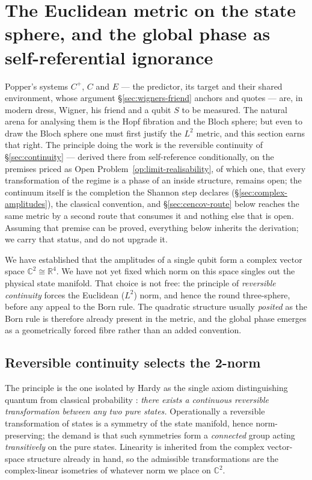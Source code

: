 \section{The Euclidean metric on the state sphere, and the global phase as self-referential ignorance}
\label{sec:l2-metric-fibre}
Popper's systems $C^{+}$, $C$ and $E$ --- the predictor, its target and their shared
environment, whose argument \S\ref{sec:wigners-friend} anchors and quotes --- are, in modern
dress, Wigner, his friend and a qubit $S$ to be measured. The natural arena for analysing them
is the Hopf fibration and the Bloch sphere; but even to draw the Bloch sphere one must first
justify the $L^{2}$ metric, and this section earns that right. The principle doing the work is
the reversible continuity of \S\ref{sec:continuity} --- derived there from self-reference
conditionally, on the premises priced as Open Problem~\ref{op:limit-realisability}, of which one, that every
transformation of the regime is a phase of an inside structure, remains open; the continuum
itself is the completion the Shannon step declares (\S\ref{sec:complex-amplitudes}), the
classical convention, and \S\ref{sec:cencov-route} below reaches the same metric by a
second route that consumes it and nothing else that is open. Assuming that premise can be proved,
everything below inherits the derivation; we carry that status, and do not upgrade it.

We have established that the amplitudes of a single qubit form a complex vector space
$\mathbb{C}^{2}\cong\mathbb{R}^{4}$. We have not yet fixed which norm on this space singles out
the physical state manifold. That choice is not free: the principle of
\emph{reversible continuity} forces the Euclidean ($L^{2}$) norm, and hence the round
three-sphere, before any appeal to the Born rule. The quadratic structure usually \emph{posited}
as the Born rule is therefore already present in the metric, and the global phase emerges as a
geometrically forced fibre rather than an added convention.

\subsection{Reversible continuity selects the 2-norm}
\label{sec:reversible-continuity-l2}

The principle is the one isolated by Hardy as the single axiom distinguishing quantum from
classical probability \autocite{Hardy2001a}:
\emph{there exists a continuous reversible transformation between any two pure states.}
Operationally a reversible transformation of states is a symmetry of the state manifold, hence
norm-preserving; the demand is that such symmetries form a \emph{connected} group acting
\emph{transitively} on the pure states. Linearity is inherited from the complex vector-space
structure already in hand, so the admissible transformations are the complex-linear isometries
of whatever norm we place on $\mathbb{C}^{2}$.

